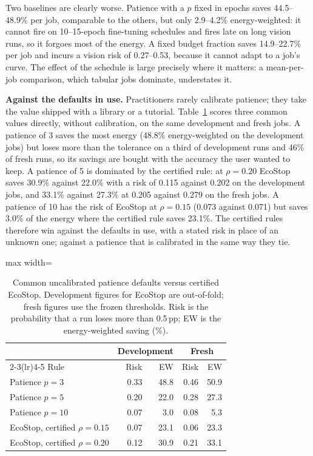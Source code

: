 \documentclass[3p,twocolumn,10pt]{elsarticle}
\theoremstyle{definition}
\begin{document}
Two baselines are clearly worse. Patience with a $p$ fixed in epochs saves 44.5--48.9\% per job, comparable to the others, but only 2.9--4.2\% energy-weighted: it cannot fire on 10--15-epoch fine-tuning schedules and fires late on long vision runs, so it forgoes most of the energy. A fixed budget fraction saves 14.9--22.7\% per job and incurs a vision risk of 0.27--0.53, because it cannot adapt to a job's curve. The effect of the schedule is large precisely where it matters: a mean-per-job comparison, which tabular jobs dominate, understates it.

\textbf{Against the defaults in use.} Practitioners rarely calibrate patience; they take the value shipped with a library or a tutorial. Table~\ref{tab:defaults} scores three common values directly, without calibration, on the same development and fresh jobs. A patience of 3 saves the most energy (48.8\% energy-weighted on the development jobs) but loses more than the tolerance on a third of development runs and 46\% of fresh runs, so its savings are bought with the accuracy the user wanted to keep. A patience of 5 is dominated by the certified rule: at $\rho=0.20$ EcoStop saves 30.9\% against 22.0\% with a risk of 0.115 against 0.202 on the development jobs, and 33.1\% against 27.3\% at 0.205 against 0.279 on the fresh jobs. A patience of 10 has the risk of EcoStop at $\rho=0.15$ (0.073 against 0.071) but saves 3.0\% of the energy where the certified rule saves 23.1\%. The certified rules therefore win against the defaults in use, with a stated risk in place of an unknown one; against a patience that is calibrated in the same way they tie.

\begin{table}[t]
\centering
\caption{Common uncalibrated patience defaults versus certified EcoStop. Development figures for EcoStop are out-of-fold; fresh figures use the frozen thresholds. Risk is the probability that a run loses more than 0.5\,pp; EW is the energy-weighted saving (\%).}
\label{tab:defaults}
\footnotesize
\begin{adjustbox}{max width=\columnwidth}
\begin{tabular}{p{3.4cm}rrrr}
\toprule
 & \multicolumn{2}{c}{Development} & \multicolumn{2}{c}{Fresh} \\
\cmidrule(lr){2-3}\cmidrule(lr){4-5}
Rule & Risk & EW & Risk & EW \\
\midrule
Patience $p=3$ & 0.33 & 48.8 & 0.46 & 50.9 \\
Patience $p=5$ & 0.20 & 22.0 & 0.28 & 27.3 \\
Patience $p=10$ & 0.07 & 3.0 & 0.08 & 5.3 \\
EcoStop, certified $\rho=0.15$ & 0.07 & 23.1 & 0.06 & 23.3 \\
EcoStop, certified $\rho=0.20$ & 0.12 & 30.9 & 0.21 & 33.1 \\
\bottomrule
\end{tabular}
\end{adjustbox}
\end{table}
\end{document}
